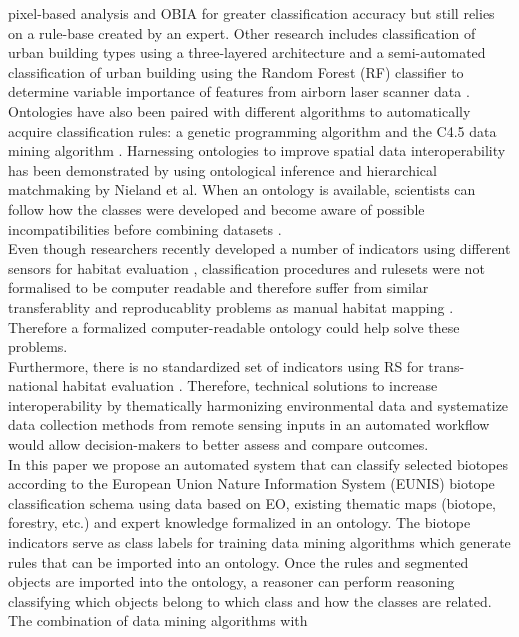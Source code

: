 \documentclass[authoryear, review,12pt,number]{elsarticle}
\begin{document}
pixel-based analysis and OBIA for greater classification accuracy but still
relies on a rule-base created by an expert. Other research includes
classification of urban building types using a three-layered architecture
\citep{diSciascio2013} and a semi-automated classification of urban building
using the Random Forest (RF) classifier to determine variable importance of
features from airborn laser scanner data \citep{Belgiu2014}. Ontologies have
also been paired with different algorithms to automatically acquire
classification rules: a genetic programming algorithm
\citep{Forestier2012470} and the C4.5 data mining algorithm
\citep{Sheeren2006ML}. Harnessing ontologies to improve spatial data
interoperability has been demonstrated by using ontological inference and
hierarchical matchmaking by Nieland et al. \citep{Nieland2015}  When an ontology
is available, scientists can follow how the classes were developed and become
aware of possible incompatibilities before combining datasets
\citep{Janowicz2012}.
\\
Even though researchers recently developed a number of indicators using
different sensors for habitat evaluation \citep{Nagendra2013}, classification
procedures and rulesets were not formalised to be computer readable and
therefore suffer from similar transferablity and reproducablity problems as
manual habitat mapping \citep{Arvor2013} \citep{Nieland2015}. Therefore a
formalized computer-readable ontology could help solve these problems.
\\
Furthermore, there is no standardized set of indicators
using RS for trans-national habitat evaluation \citep{Lucas2015}. Therefore,
technical solutions to increase interoperability by thematically harmonizing
environmental data and systematize data collection methods from remote sensing
inputs in an automated workflow would allow decision-makers to better assess and
compare outcomes.
\\
In this paper we propose an automated system that can
classify selected biotopes according to the European Union Nature Information
System (EUNIS) biotope classification schema using data based on EO, existing
thematic maps (biotope, forestry, etc.) and expert knowledge formalized in an
ontology. The biotope indicators serve as class labels for training data mining
algorithms which generate rules that can be imported into an ontology. Once the
rules and segmented objects are imported into the ontology, a reasoner can
perform reasoning classifying which objects belong to which class and how the
classes are related. The combination of data mining algorithms with
\end{document}
